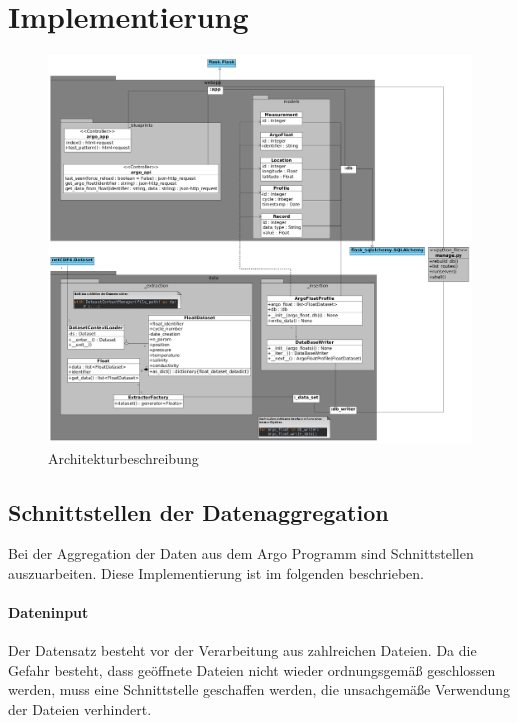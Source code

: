 \section{Implementierung}

\begin{figure}[h]
 \centering
 \includegraphics[width=\textwidth]{pix/Modulschema_komplett.png}
 \caption{Architekturbeschreibung}
 \label{fig:modulschema}
\end{figure}

\subsection{Schnittstellen der Datenaggregation}

Bei der Aggregation der Daten aus dem Argo Programm sind Schnittstellen auszuarbeiten. Diese Implementierung ist im folgenden beschrieben. 

\paragraph{Dateninput}

Der Datensatz besteht vor der Verarbeitung aus zahlreichen Dateien. Da die Gefahr besteht, dass geöffnete Dateien nicht wieder ordnungsgemäß geschlossen werden, muss eine Schnittstelle geschaffen werden, die unsachgemäße Verwendung der Dateien verhindert. 

